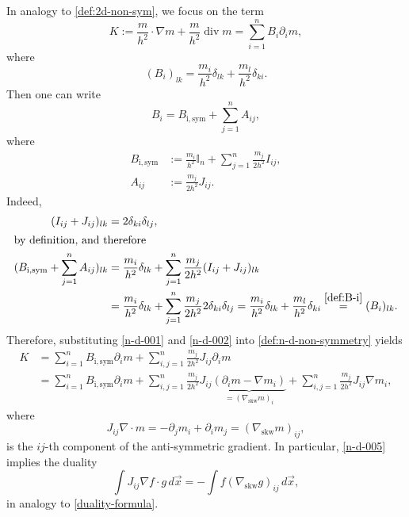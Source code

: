 \documentclass[reqno,11pt]{amsart}
\DeclareMathOperator{\Div}{div}
\theoremstyle{plain}
\theoremstyle{definition}
\numberwithin{equation}{section}
\begin{document}
In analogy to \eqref{def:2d-non-sym}, we focus on the term 
\begin{equation}
    \label{def:n-d-non-symmetry}
    K:= \frac{m}{h^2} \cdot \nabla m + \frac{m}{h^2} \Div m =  \sum_{i=1}^n B_i \partial_i m,
\end{equation}
where 
\begin{equation}
    \label{def:B-i}
    (B_i)_{lk} = \frac{m_i}{h^2} \delta_{lk}  + 
        \frac{m_l}{h^2} \delta_{ki}.
\end{equation}
Then one can write
\begin{equation}
    \label{n-d-001}
    B_i = B_\mathrm{i,sym} + \sum_{j=1}^n A_{ij},
\end{equation}
where
\begin{equation}
    \label{n-d-002}
    \begin{aligned}
        B_\mathrm{i,sym}&:= \frac{m_i}{h^2} \mathbb I_n +
        \sum_{j=1}^n\frac{m_j}{2 h^2} I_{ij}, \\
        A_{ij} & :=
        \frac{m_j}{2 h^2} J_{ij}. 
    \end{aligned}
\end{equation}
Indeed,
\begin{align*}
    ( I_{ij} + J_{ij} )_{lk} & = 2 \delta_{ki} \delta_{lj}, \\
    \intertext{by definition, and therefore}
    (B_\mathrm{i,sym} + \sum_{j=1}^n A_{ij})_{lk} & = \frac{m_i}{h^2} \delta_{lk} + \sum_{j=1}^n \frac{m_j}{2h^2} (I_{ij} + J_{ij})_{lk} \\
    & = \frac{m_i}{h^2} \delta_{lk} + \sum_{j=1}^n \frac{m_j}{2h^2} 2 \delta_{ki}\delta_{lj} 
    = \frac{m_i}{h^2}\delta_{lk} + \frac{m_l}{h^2}\delta_{ki} \overset{\eqref{def:B-i}}{=} (B_i)_{lk}.
\end{align*}
Therefore, substituting \eqref{n-d-001} and \eqref{n-d-002} into \eqref{def:n-d-non-symmetry} yields 
\begin{equation}
    \label{n-d-003}
    \begin{aligned}
    K & = \sum_{i=1}^n B_\mathrm{i,sym} \partial_i m + \sum_{i,j=1}^n \frac{m_j}{2h^2} J_{ij} \partial_i m \\ & = \sum_{i=1}^n B_\mathrm{i,sym} \partial_i m + \sum_{i,j=1}^n \frac{m_j}{2h^2} J_{ij} \underbrace{(\partial_i m - \nabla m_i)}_{= (\nabla_\mathrm{skw} m)_i }  + \sum_{i,j=1}^n \frac{m_j}{2h^2} J_{ij} \nabla m_i,
    \end{aligned}
\end{equation}
where
\begin{equation}
    \label{n-d-005}
    J_{ij} \nabla \cdot m = - \partial_j m_i + \partial_i m_j = (\nabla_\mathrm{skw} m)_{ij},
\end{equation}
is the $ ij $-th component of the anti-symmetric gradient. 
In particular, \eqref{n-d-005} implies the duality
\begin{equation}
    \label{duality-n-d}
    \int J_{ij}\nabla f \cdot g \,d\vec x = - \int f (\nabla_\mathrm{skw} g)_{ij} \,d\vec x,
\end{equation}
in analogy to \eqref{duality-formula}.
\end{document}
